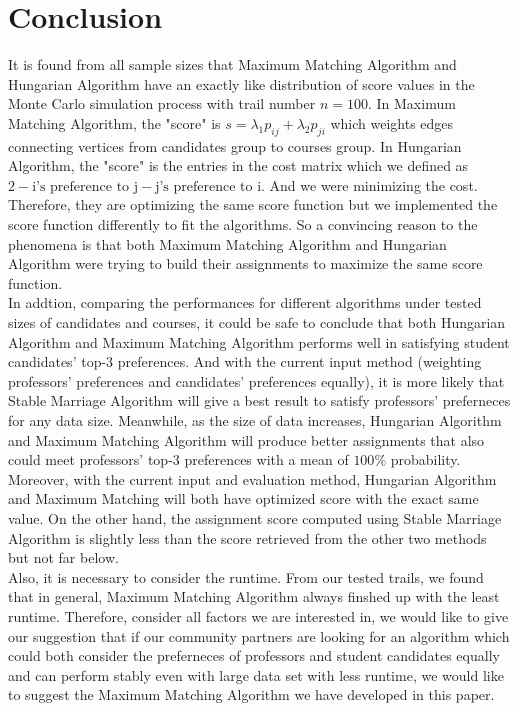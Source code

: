 \documentclass[twoside,twocolumn]{article}
\begin{document}
    \section{Conclusion}
    It is found from all sample sizes that Maximum Matching Algorithm and Hungarian Algorithm have an exactly like
    distribution of score values in the Monte Carlo simulation process with trail number $n=100$. In Maximum Matching 
    Algorithm, the "score" is $s = \lambda_1 p_{ij} + \lambda_2 p_{ji}$ which weights 
    edges connecting vertices from candidates group to courses group. In Hungarian Algorithm, the "score" is the entries
    in the cost matrix which we defined as $2 - \text{i's preference to j} - \text{j's preference to i}$. And we were 
    minimizing the cost. Therefore, they are optimizing the same score function but we implemented the score function 
    differently to fit the algorithms. So a convincing reason to the phenomena is that both Maximum Matching Algorithm and 
    Hungarian Algorithm were trying to build their assignments to maximize the same score function. 
    \\\indent In addtion, comparing the performances for different algorithms under tested sizes of candidates and courses, it could be
    safe to conclude that both Hungarian Algorithm and Maximum Matching Algorithm performs well in satisfying student candidates'
    top-3 preferences. And with the current input method (weighting professors' preferences and candidates' preferences equally), it is
    more likely that Stable Marriage Algorithm will give a best result to satisfy professors' preferneces for any data size. Meanwhile, 
    as the size of data increases, Hungarian Algorithm and Maximum Matching Algorithm will produce better assignments that also could 
    meet professors' top-3 preferences with a mean of $100\%$ probability.
    \\\indent Moreover, with the current input and evaluation method, Hungarian Algorithm and Maximum Matching will both have optimized score
    with the exact same value. On the other hand, the assignment score computed using Stable Marriage Algorithm is slightly less than the score
    retrieved from the other two methods but not far below.
    \\\indent Also, it is necessary to consider the runtime. From our tested trails, we found that in general, Maximum Matching Algorithm
    always finshed up with the least runtime. Therefore, consider all factors we are interested in, we would like to give our suggestion that
    if our community partners are looking for an algorithm which could both consider the preferneces of professors and student candidates equally
    and can perform stably even with large data set with less runtime, we would like to suggest the Maximum Matching Algorithm we have developed
    in this paper.
\end{document}

